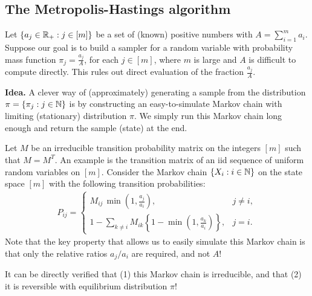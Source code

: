 \documentclass[a4paper,10pt,english]{article}
\begin{document}

\subsection{The Metropolis-Hastings algorithm}
Let $\{a_j \in \mathbb{R}_+: j \in [m]\}$ be a set of (known) positive numbers with $A=\sum_{i=1}^{m}a_i$. 
Suppose our goal is to build a sampler for a random variable with probability mass function $\pi_j = \frac{a_j}{A}$, for each $j \in [m]$, where  $m$ is large and $A$ is difficult to compute directly. 
This rules out direct evaluation of the fraction $\frac{a_j}{A}$. 

{\bf Idea.} 
A clever way of (approximately) generating a sample from the distribution $\pi = \{\pi_j: j \in \mathbb{N}\}$ is by constructing an easy-to-simulate Markov chain with limiting (stationary) distribution $\pi$. 
We simply run this Markov chain long enough and return the sample (state) at the end.  

Let $M$ be an irreducible transition probability matrix on the integers $[m]$ such that $M = M^T$. 
An example is the transition matrix of an iid sequence of uniform random variables on $[m]$.  
Consider the Markov chain $\{X_i: i \in \mathbb{N}\}$ on the state space $[m]$ with the following transition probabilities:
\begin{align*}
P_{ij} = \begin{cases}
       M_{ij} \, \min\left(1,\frac{a_j}{a_i}\right), & j \neq i,\\
       1 - \sum_{k \neq i}M_{ik}\left\{1-\min\left(1,\frac{a_k}{a_i}\right)\right\}, & j = i.
     \end{cases}
\end{align*} 
Note that the key property that allows us to easily simulate this Markov chain is that only the relative ratios $a_j/a_i$ are required, and not $A$!

It can be directly verified that (1) this Markov chain is irreducible, and that (2) it is reversible with equilibrium distribution $\pi$!
\end{document}
